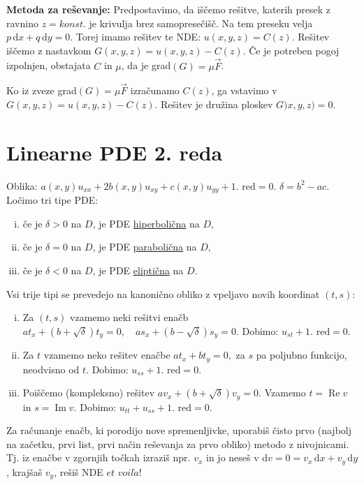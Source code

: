 \documentclass[10pt,a4paper]{amsart}
\theoremstyle{definition} %
\theoremstyle{plain} %
\newcommand{\dx}{\ensuremath{\,\mathrm{d}x}}
\newcommand{\dy}{\ensuremath{\,\mathrm{d}y}}
\begin{document}
\textbf{Metoda za reševanje:} Predpostavimo, da iščemo rešitve, katerih presek z
ravnino $z = konst.$ je krivulja brez samopresečišč. Na tem preseku velja $p\dx
+ q \dy=0$. Torej imamo rešitev te NDE: $u(x,y,z) = C(z).$ Rešitev iščemo z
nastavkom $G(x,y,z) = u(x,y,z) - C(z)$. Če je potreben pogoj izpolnjen,
obstajata $C$ in $\mu$, da je grad$(G) = \mu \vec{F}$.

Ko iz zveze grad$(G) = \mu \vec{F}$ izračunamo $C(z)$, ga vstavimo v $G(x,y,z) =
u(x,y,z) - C(z)$. Rešitev je družina ploskev $G)x,y,z) = 0$.


\section*{Linearne PDE 2. reda}

Oblika: $a(x,y)u_{xx} + 2b(x,y)u_{xy} + c(x,y)u_{yy} + 1. \text{ red} = 0$.
$\delta = b^2 -ac$. Ločimo tri tipe PDE:

\begin{enumerate}[(i)]
  \item če je $\delta > 0 $ na $D$, je PDE \underline{hiperbolična} na $D$,
  \item če je $\delta = 0 $ na $D$, je PDE \underline{parabolična} na $D$,
  \item če je $\delta < 0 $ na $D$, je PDE \underline{eliptična} na $D$.
\end{enumerate}

Vsi trije tipi se prevedejo na kanonično obliko z vpeljavo novih koordinat
$(t,s)$:

\begin{enumerate}[(i)]
  \item Za $(t,s)$ vzamemo neki rešitvi enačb $ at_x + (b+\sqrt{\delta})t_y=0,
    \quad as_x + (b-\sqrt{\delta})s_y =0.$ Dobimo: $u_{st} + 1. \text{ red} = 0.$
  \item Za $t$ vzamemo neko rešitev enačbe $ at_x + bt_y = 0, $ za $s$ pa poljubno
    funkcijo, neodvisno od $t$. Dobimo: $u_{ss}+ 1. \text{ red}=0$.
  \item Poiščemo (kompleksno) rešitev $av_x + (b+\sqrt{\delta})v_y = 0$. Vzamemo
    $t = \operatorname{Re}v$ in $s = \operatorname{Im}v$. Dobimo: $u_{tt}+u_{ss}+
    1. \text{ red}=0$.
\end{enumerate} Za računanje enačb, ki porodijo nove spremenljivke, uporabiš
čisto prvo (najbolj na začetku, prvi list, prvi način reševanja za prvo obliko)
metodo z nivojnicami. Tj. iz enačbe v zgornjih točkah izraziš npr. $v_x$ in jo
neseš v $\text{d}v = 0 = v_x\dx + v_y \dy$, krajšaš $v_y$, rešiš NDE $et$
$voil\grave{a}$!
\end{document}
